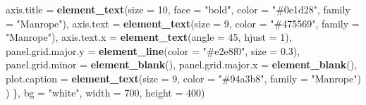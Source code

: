 \documentclass[
]{article}
\newenvironment{Shaded}{\begin{snugshade}}{\end{snugshade}}
\newcommand{\AttributeTok}[1]{\textcolor[rgb]{0.13,0.29,0.53}{#1}}
\newcommand{\DecValTok}[1]{\textcolor[rgb]{0.00,0.00,0.81}{#1}}
\newcommand{\FloatTok}[1]{\textcolor[rgb]{0.00,0.00,0.81}{#1}}
\newcommand{\FunctionTok}[1]{\textcolor[rgb]{0.13,0.29,0.53}{\textbf{#1}}}
\newcommand{\NormalTok}[1]{#1}
\newcommand{\StringTok}[1]{\textcolor[rgb]{0.31,0.60,0.02}{#1}}
\begin{document}
\begin{Shaded}
\begin{Highlighting}[]
          \AttributeTok{axis.title =} \FunctionTok{element\_text}\NormalTok{(}\AttributeTok{size =} \DecValTok{10}\NormalTok{, }\AttributeTok{face =} \StringTok{"bold"}\NormalTok{, }\AttributeTok{color =} \StringTok{"\#0e1d28"}\NormalTok{, }\AttributeTok{family =} \StringTok{"Manrope"}\NormalTok{),}
          \AttributeTok{axis.text =} \FunctionTok{element\_text}\NormalTok{(}\AttributeTok{size =} \DecValTok{9}\NormalTok{, }\AttributeTok{color =} \StringTok{"\#475569"}\NormalTok{, }\AttributeTok{family =} \StringTok{"Manrope"}\NormalTok{),}
          \AttributeTok{axis.text.x =} \FunctionTok{element\_text}\NormalTok{(}\AttributeTok{angle =} \DecValTok{45}\NormalTok{, }\AttributeTok{hjust =} \DecValTok{1}\NormalTok{),}
          \AttributeTok{panel.grid.major.y =} \FunctionTok{element\_line}\NormalTok{(}\AttributeTok{color =} \StringTok{"\#e2e8f0"}\NormalTok{, }\AttributeTok{size =} \FloatTok{0.3}\NormalTok{),}
          \AttributeTok{panel.grid.minor =} \FunctionTok{element\_blank}\NormalTok{(),}
          \AttributeTok{panel.grid.major.x =} \FunctionTok{element\_blank}\NormalTok{(),}
          \AttributeTok{plot.caption =} \FunctionTok{element\_text}\NormalTok{(}\AttributeTok{size =} \DecValTok{9}\NormalTok{, }\AttributeTok{color =} \StringTok{"\#94a3b8"}\NormalTok{, }\AttributeTok{family =} \StringTok{"Manrope"}\NormalTok{)}
\NormalTok{        )}
\NormalTok{    \}, }\AttributeTok{bg =} \StringTok{"white"}\NormalTok{, }\AttributeTok{width =} \DecValTok{700}\NormalTok{, }\AttributeTok{height =} \DecValTok{400}\NormalTok{)}
    

\end{Highlighting}
\end{Shaded}
\end{document}
